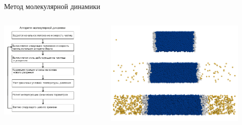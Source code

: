 \documentclass{beamer}
\begin{document}
\begin{frame}{Метод молекулярной динамики}
\footnotesize{

\begin{columns}
\begin{column}{0.4\linewidth}

\centering
    \includegraphics[width=\textwidth]{blocksheme}

\end{column}


\begin{column}{0.6\linewidth}

\begin{figure}
    \centering
    \includegraphics[width=\textwidth]{PRIMe-Figure101}
\end{figure}


\end{column}
\end{columns}}
\end{frame}
\end{document}
